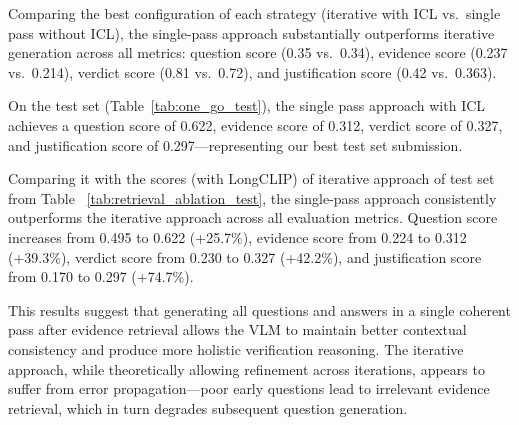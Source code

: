 \begin{table}[ht]
\centering
\caption{Single pass QA generation pipeline performance on the validation set.}
\label{tab:one_go_val}
\end{table}


Comparing the best configuration of each strategy (iterative with ICL vs.\ single pass without ICL), the single-pass approach substantially outperforms iterative generation across all metrics: question score (0.35 vs.\ 0.34), evidence score (0.237 vs.\ 0.214), verdict score (0.81 vs.\ 0.72), and justification score (0.42 vs.\ 0.363).

On the test set (Table~\ref{tab:one_go_test}), the single pass approach with ICL achieves a question score of 0.622, evidence score of 0.312, verdict score of 0.327, and justification score of 0.297—representing our best test set submission.

Comparing it with the scores (with LongCLIP) of iterative approach of test set from Table ~\ref{tab:retrieval_ablation_test}, the single-pass approach consistently outperforms the iterative approach across all evaluation metrics. Question score increases from 0.495 to 0.622 (+25.7\%), evidence score from 0.224 to 0.312 (+39.3\%), verdict score from 0.230 to 0.327 (+42.2\%), and justification score from 0.170 to 0.297 (+74.7\%).

This results suggest that generating all questions and answers in a single coherent pass after evidence retrieval allows the VLM to maintain better contextual consistency and produce more holistic verification reasoning. The iterative approach, while theoretically allowing refinement across iterations, appears to suffer from error propagation—poor early questions lead to irrelevant evidence retrieval, which in turn degrades subsequent question generation.

